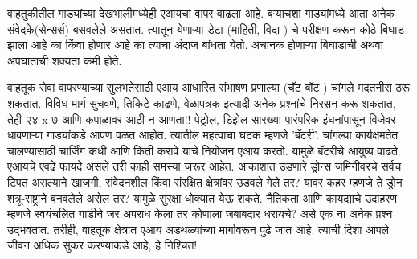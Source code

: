 वाहतुकीतील गाड्यांच्या देखभालीमध्येही एआयचा वापर वाढला आहे. बऱ्याचशा गाड्यांमध्ये आता अनेक संवेदके(सेन्सर्स) बसवलेले असतात. त्यातून येणाऱ्या डेटा (माहिती, विदा ) चे परीक्षण करून कोठे बिघाड झाला आहे का किंवा होणार आहे का त्याचा अंदाज बांधता येतो. अचानक होणाऱ्या बिघाडाची अथवा अपघाताची शक्यता कमी होते.

वाहतूक सेवा वापरण्याच्या सुलभतेसाठी एआय आधारित संभाषण प्रणाल्या (चॅट बॉट ) चांगले मदतनीस ठरू शकतात. विविध मार्ग सुचवणे, तिकिटे काढणे, वेळापत्रक इत्यादी अनेक प्रश्नांचे निरसन करू शकतात, तेही २४ x ७ आणि कपाळावर आठी न आणता!! पेट्रोल, डिझेल सारख्या पारंपरिक इंधनांपासून विजेवर धावणाऱ्या गाड्यांकडे आपण वळत आहोत. त्यातील महत्वाचा घटक म्हणजे 'बॅटरी'. चांगल्या कार्यक्षमतेत चालण्यासाठी चार्जिंग कधी आणि किती करावे याचे नियोजन एआय करतो. यामुळे बॅटरीचे आयुष्य वाढते. एआयचे एवढे फायदे असले तरी काही समस्या जरूर आहेत. आकाशात उडणारे ड्रोन्स जमिनीवरचे सर्वच टिपत असल्याने खाजगी, संवेदनशील किंवा संरक्षित क्षेत्रांवर उडवले गेले तर? यावर कहर म्हणजे ते ड्रोन शत्रू-राष्ट्राने बनवलेले असेल तर? यामुळे सुरक्षा धोक्यात येऊ शकते. नैतिकता आणि कायद्याचे उदाहरण म्हणजे स्वयंचलित गाडीने जर अपराध केला तर कोणाला जबाबदार धरायचे? असे एक ना अनेक प्रश्न उद्भवतात. तरीही, वाहतूक क्षेत्रात एआय अडथळ्यांच्या मार्गावरून पुढे जात आहे. त्याची दिशा आपले जीवन अधिक सुकर करण्याकडे आहे, हे निश्चित!